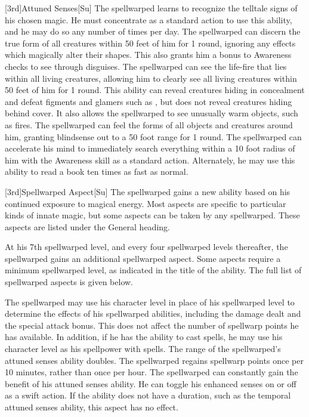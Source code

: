 [3rd]{Attuned Senses}[Su]
The spellwarped learns to recognize the telltale signs of his chosen magic.
He must concentrate as a standard action to use this ability, and he may do so any number of times per day.
The spellwarped can discern the true form of all creatures within 50 feet of him for 1 round, ignoring any effects which magically alter their shapes.
This also grants him a  bonus to Awareness checks to see through disguises.
The spellwarped can see the life-fire that lies within all living creatures, allowing him to clearly see all living creatures within 50 feet of him for 1 round.
This ability can reveal creatures hiding in concealment and defeat figments and glamers such as , but does not reveal creatures hiding behind cover.
It also allows the spellwarped to see unusually warm objects, such as fires.
The spellwarped can feel the forms of all objects and creatures around him, granting blindsense out to a 50 foot range for 1 round.
The spellwarped can accelerate his mind to immediately search everything within a 10 foot radius of him with the Awareness skill as a standard action.
Alternately, he may use this ability to read a book ten times as fast as normal.

[3rd]{Spellwarped Aspect}[Su]
The spellwarped gains a new ability based on his continued exposure to magical energy.
Most aspects are specific to particular kinds of innate magic, but some aspects can be taken by any spellwarped.
These aspects are listed under the General heading.

At his 7th spellwarped level, and every four spellwarped levels thereafter, the spellwarped gains an additional spellwarped aspect.
Some aspects require a minimum spellwarped level, as indicated in the title of the ability.
The full list of spellwarped aspects is given below.

The spellwarped may use his character level in place of his spellwarped level to determine the effects of his spellwarped abilities, including the damage dealt and the special attack bonus.
This does not affect the number of spellwarp points he has available.
In addition, if he has the ability to cast spells, he may use his character level as his spellpower with spells.
The range of the spellwarped's attuned senses ability doubles.
The spellwarped regains spellwarp points once per 10 minutes, rather than once per hour.
The spellwarped can constantly gain the benefit of his attuned senses ability.
He can toggle his enhanced senses on or off as a swift action.
If the ability does not have a duration, such as the temporal attuned senses ability, this aspect has no effect.

